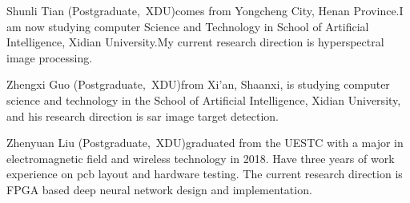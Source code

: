 \documentclass[lettersize,journal]{IEEEtran}
\begin{document}
\begin{IEEEbiography}{Shunli Tian}
	(Postgraduate,~XDU)comes from Yongcheng City, Henan Province.I am now studying computer Science and Technology in School of Artificial Intelligence, Xidian University.My current research direction is hyperspectral image processing.\end{IEEEbiography}

\begin{IEEEbiography}{Zhengxi Guo}
	(Postgraduate,~XDU)from Xi'an, Shaanxi, is studying computer science and technology in the School of Artificial Intelligence, Xidian University, and his research direction is sar image target detection.\end{IEEEbiography}

\begin{IEEEbiography}{Zhenyuan Liu}
	(Postgraduate,~XDU)graduated from the UESTC with a major in electromagnetic field and wireless technology in 2018. Have three years of work experience on pcb layout and hardware testing. The current research direction is FPGA based deep neural network design and implementation.\end{IEEEbiography}
\end{document}
